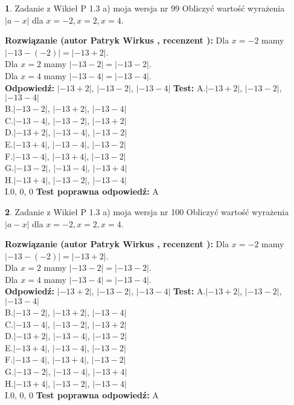 \documentclass[12pt, a4paper]{article}
\theoremstyle{definition} %
\newtheorem{zad}{}
\newcommand{\zadStart}[1]{\begin{zad}#1\newline}
\newcommand{\zadStop}{\end{zad}}
\newcommand{\rozwStart}[2]{\noindent \textbf{Rozwiązanie (autor #1 , recenzent #2): }\newline}
\newcommand{\rozwStop}{\newline}
\newcommand{\odpStart}{\noindent \textbf{Odpowiedź:}\newline}
\newcommand{\odpStop}{\newline}
\newcommand{\testStart}{\noindent \textbf{Test:}\newline}
\newcommand{\testStop}{\newline}
\newcommand{\kluczStart}{\noindent \textbf{Test poprawna odpowiedź:}\newline}
\newcommand{\kluczStop}{\newline}
\begin{document}
\zadStart{Zadanie z Wikieł P 1.3 a) moja wersja nr 99}
Obliczyć wartość wyrażenia $|a - x|$ dla $x=-2,x=2,x=4$.
\zadStop
\rozwStart{Patryk Wirkus}{}
Dla $x = -2$ mamy $|-13 - (-2)| = |-13 + 2|$.\\
Dla $x = 2$ mamy $|-13 - 2| = |-13 - 2|$.\\
Dla $x = 4$ mamy $|-13 - 4| = |-13 - 4|$.\\
\rozwStop
\odpStart
$|-13 + 2|$, $|-13 - 2|$, $|-13 - 4|$
\odpStop
\testStart
A.$|-13 + 2|$, $|-13 - 2|$, $|-13 - 4|$\\
B.$|-13 - 2|$, $|-13 + 2|$, $|-13 - 4|$\\
C.$|-13 - 4|$, $|-13 - 2|$, $|-13 + 2|$\\
D.$|-13 + 2|$, $|-13 - 4|$, $|-13 - 2|$\\
E.$|-13 + 4|$, $|-13 - 4|$, $|-13 - 2|$\\
F.$|-13 - 4|$, $|-13 + 4|$, $|-13 - 2|$\\
G.$|-13 - 2|$, $|-13 - 4|$, $|-13 + 4|$\\
H.$|-13 + 4|$, $|-13 - 2|$, $|-13 - 4|$\\
I.$0$, $0$, $0$
\testStop
\kluczStart
A
\kluczStop



\zadStart{Zadanie z Wikieł P 1.3 a) moja wersja nr 100}
Obliczyć wartość wyrażenia $|a - x|$ dla $x=-2,x=2,x=4$.
\zadStop
\rozwStart{Patryk Wirkus}{}
Dla $x = -2$ mamy $|-13 - (-2)| = |-13 + 2|$.\\
Dla $x = 2$ mamy $|-13 - 2| = |-13 - 2|$.\\
Dla $x = 4$ mamy $|-13 - 4| = |-13 - 4|$.\\
\rozwStop
\odpStart
$|-13 + 2|$, $|-13 - 2|$, $|-13 - 4|$
\odpStop
\testStart
A.$|-13 + 2|$, $|-13 - 2|$, $|-13 - 4|$\\
B.$|-13 - 2|$, $|-13 + 2|$, $|-13 - 4|$\\
C.$|-13 - 4|$, $|-13 - 2|$, $|-13 + 2|$\\
D.$|-13 + 2|$, $|-13 - 4|$, $|-13 - 2|$\\
E.$|-13 + 4|$, $|-13 - 4|$, $|-13 - 2|$\\
F.$|-13 - 4|$, $|-13 + 4|$, $|-13 - 2|$\\
G.$|-13 - 2|$, $|-13 - 4|$, $|-13 + 4|$\\
H.$|-13 + 4|$, $|-13 - 2|$, $|-13 - 4|$\\
I.$0$, $0$, $0$
\testStop
\kluczStart
A
\kluczStop
\end{document}
